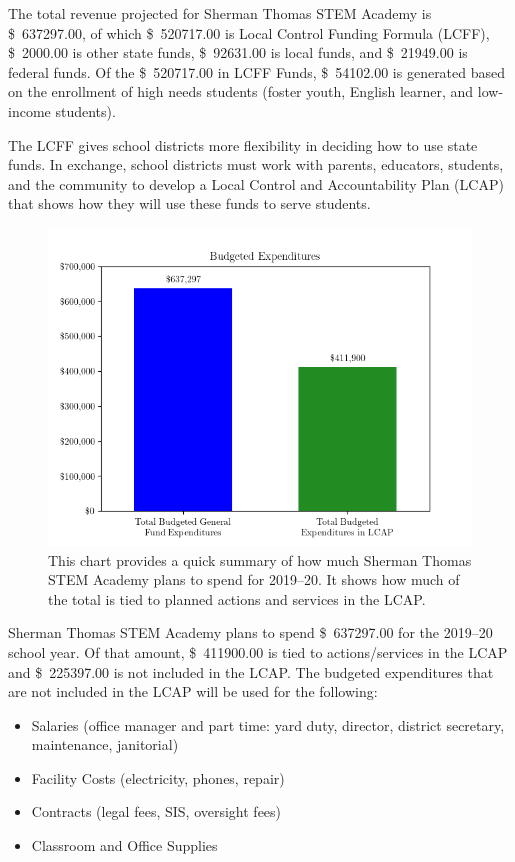 \documentclass{article}
\newcommand{\dollar}[1]{\SI{#1}[\$]{}}
\newcounter{goal}[section] %
\newcounter{action}[goal]
\begin{document}
The total revenue projected for Sherman Thomas STEM Academy is \dollar{637297.00}, of which \dollar{520717.00} is Local Control Funding Formula (LCFF), \dollar{2000.00} is other state funds, \dollar{92631.00} is local funds, and \dollar{21949.00} is federal funds. Of the \dollar{520717.00} in LCFF Funds, \dollar{54102.00} is generated based on the enrollment of high needs students (foster youth, English learner, and low-income students).

The LCFF gives school districts more flexibility in deciding how to use state funds. In exchange, school districts must work with parents, educators, students, and the community to develop a Local Control and Accountability Plan (LCAP) that shows how they will use these funds to serve students.

\begin{figure}[h!btp]
\centering
\includegraphics[scale=0.8]{expend}
\caption*{This chart provides a quick summary of how much Sherman Thomas STEM Academy plans to spend for 2019--20. It shows how much of the total is tied to planned actions and services in the LCAP.}
\end{figure}

Sherman Thomas STEM Academy plans to spend \dollar{637297.00} for the 2019--20 school year. Of that amount, \dollar{411900.00} is tied to actions/services in the LCAP and \dollar{225397.00} is not included in the LCAP. The budgeted expenditures that are not included in the LCAP will be used for the following:
\begin{itemize}
\setlength\itemsep{0em}
	\item Salaries (office manager and part time: yard duty, director, district secretary, maintenance, janitorial)
	\item Facility Costs (electricity, phones, repair)
	\item Contracts (legal fees, SIS, oversight fees)
	\item Classroom and Office Supplies
\end{itemize}
\end{document}
